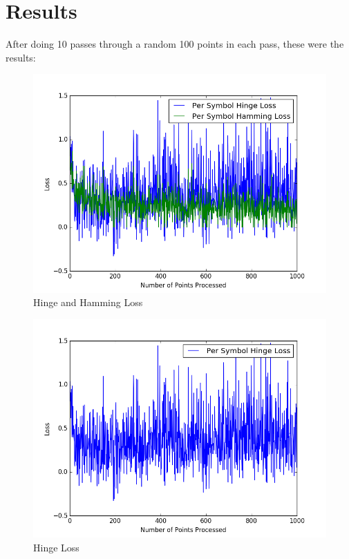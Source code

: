 \documentclass[twoside,11pt]{article}
\theoremstyle{definition}
\begin{document}
\newpage

\section*{Results}

After doing 10 passes through a random 100 points in each pass, these were the results: 

\begin{figure}[h]
\centering
\includegraphics[width=5in]{hingeHammingLoss1.png}
\caption{Hinge and Hamming Loss}
\end{figure}

\begin{figure}[h]
\centering
\includegraphics[width=5in]{hingeLoss1.png}
\caption{Hinge Loss}
\end{figure}
\end{document}
